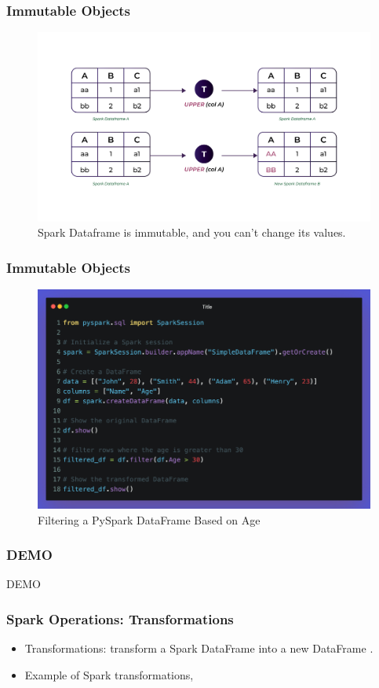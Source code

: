 \begin{frame}
    \frametitle{Immutable Objects}
    \begin{figure}
        \includegraphics[width=\textwidth,height=.7\textheight,keepaspectratio]{./Figures/chapter-04/Immutable_df}
        \caption{Spark Dataframe is immutable, and you can't change its values.}\label{fig:Immutable_df}
    \end{figure}
\end{frame}

\begin{frame}[fragile]
    \frametitle{Immutable Objects}
    \begin{figure}
        \includegraphics[width=\textwidth,height=.75\textheight,keepaspectratio]{./Figures/chapter-04/pyspark_immutable_df}
        \caption{Filtering a PySpark DataFrame Based on Age}\label{fig:pyspark_immutable_df}
    \end{figure}
\end{frame}
\begin{frame}[fragile]
    \frametitle{DEMO}
    DEMO
\end{frame}
\begin{frame}
    \frametitle{Spark Operations: Transformations}
    \begin{itemize}
        \item Transformations: transform a Spark DataFrame into a new DataFrame \textit{\color{blue}{without altering the original data}}.
        \item Example of Spark transformations, \texttt{\color{orange}{map(), select(), filter(), or drop()} }
    \end{itemize}
\end{frame}

